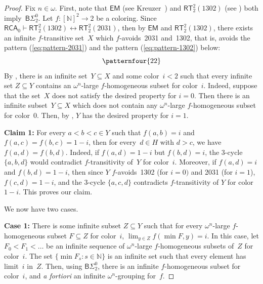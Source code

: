 \documentclass{article}
\numberwithin{theorem}{section}
\newtheorem{proposition}[theorem]{Proposition}
\newcommand{\quentin}[1]{\textcolor{green}{#1}}
\def\LL{\mathbb{L}}
\newcommand{\BSig}{\mathsf{B}\Sigma^0}
\newcommand{\RCA}[0]{\mathsf{RCA}}
\newcommand{\EM}[0]{\mathsf{EM}}
\newcommand{\RT}[0]{\mathsf{RT}}
\newcommand{\GP}{\mathsf{GP}}
\newcommand{\NN}[0]{\mathbb{N}}
\begin{document}
\begin{proof}
Fix $n \in \omega$. First, note that $\EM$ (see Kreuzer~\cite{kreuzer2012primitive}) and $\RT^2_2(1302)$ (see ) both imply~$\BSig_2$.
Let $f : [\NN]^2 \to 2$ be a coloring.
Since $\RCA_0 \vdash \RT^2_2(1302) \leftrightarrow \RT^2_2(2031)$, then by $\EM$ and $\RT^2_2(1302)$, there exists an infinite $f$-transitive set~$X$ which $f$-avoids~2031 and~1302, that is, avoids the pattern (\ref{eq:pattern-2031}) and the pattern (\ref{eq:pattern-1302}) below:
\vspace{1.3cm}
\begin{equation}\label{eq:pattern-1302}
\patternfour{22}    
\end{equation}
By , there is an infinite set~$Y \subseteq X$ and some color~$i < 2$ %
such that every infinite set $Z \subseteq Y$ contains an $\omega^n$-large $f$-homogeneous subset for color~$i$. Indeed, suppose that the set~$X$ does not satisfy the desired property for $i = 0$. Then there is an infinite subset~$Y \subseteq X$ which does not contain any $\omega^n$-large $f$-homogeneous subset for color~0. Then, by  , $Y$ has the desired property for $i = 1$.
\smallskip

\textbf{Claim 1:} For every $a < b < c \in Y$ such that $f(a, b) = i$ and $f(a, c) = f(b, c) = 1-i$,
then for every~$d \in H$ with $d > c$, we have $f(a, d) = f(b, d)$.
Indeed, if $f(a, d) = 1-i$ but $f(b, d) = i$, the 3-cycle $\{a, b, d\}$ would contradict $f$-transitivity of~$Y$ for color~$i$. Moreover, if $f(a, d) = i$ and $f(b, d) = 1-i$, then since $Y$ $f$-avoids~1302 (for $i=0)$ and 2031 (for $i=1$), $f(c, d) = 1-i$, and the 3-cycle $\{a, c, d\}$ contradicts $f$-transitivity of $Y$ for color~$1-i$. This proves our claim.
\smallskip

We now have two cases.

\smallskip
\textbf{Case 1:} There is some infinite subset $Z \subseteq Y$ such that for every $\omega^n$-large $f$-homogeneous subset $F \subseteq Z$ for color~$i$, $\lim_{y \in Z} f(\min F, y) = i$.
In this case, let $F_0 < F_1 < \dots$ be an infinite sequence of $\omega^n$-large $f$-homogeneous subsets of~$Z$ for color~$i$. The set $\{ \min F_s : s \in \NN \}$ is an infinite set such that every element has limit~$i$ in~$Z$. Then, using $\BSig_2$, there is an infinite $f$-homogeneous subset for color~$i$, and \emph{a fortiori} an infinite $\omega^n$-grouping for~$f$.


\end{proof}
\end{document}
